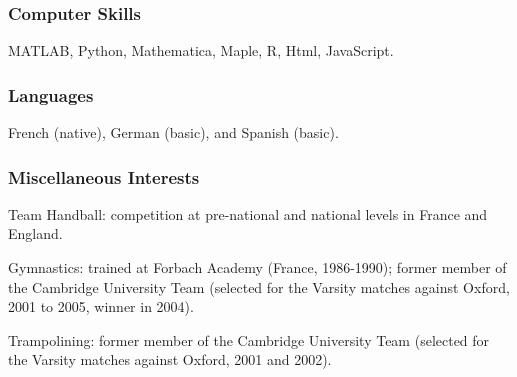 \documentclass[11pt]{article}
\begin{document}
\subsubsection{Computer Skills} 
MATLAB, Python, Mathematica, Maple, R, Html, JavaScript.

\subsubsection{Languages}
French (native), German (basic), and Spanish (basic).

\subsubsection{Miscellaneous Interests} 
\bitemize
\item Team Handball: competition at pre-national and national levels in France and England.
\item Gymnastics:  trained at Forbach Academy (France, 1986-1990); former member of the Cambridge University Team (selected for the Varsity matches against Oxford, 2001 to 2005, winner in 2004).
\item Trampolining: former member of the Cambridge University Team (selected for the Varsity matches against Oxford, 2001 and 2002).
\eitemize

\end{document}
